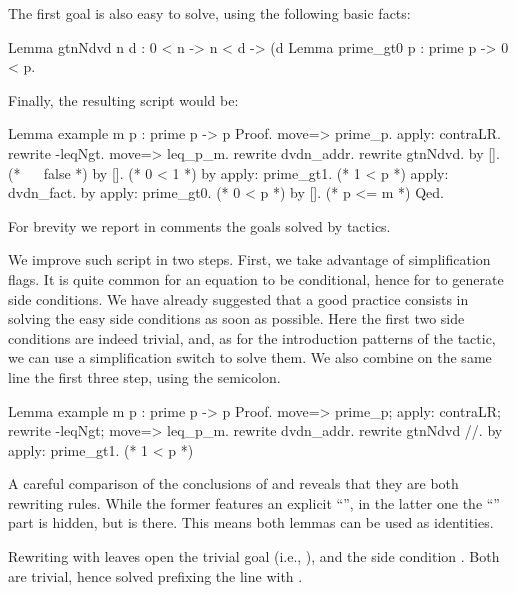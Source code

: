 The first goal is also easy to solve, using the following basic facts:

\begin{coq}{}{}
Lemma gtnNdvd n d : 0 < n -> n < d -> (d %
Lemma prime_gt0 p : prime p -> 0 < p.
\end{coq}
Finally, the resulting script would be:

\begin{coq}{}{}
Lemma example m p : prime p -> p %
Proof.
move=> prime_p.
apply: contraLR.
rewrite -leqNgt.
move=> leq_p_m.
rewrite dvdn_addr.
  rewrite gtnNdvd.
    by [].  (* ~~ false *)
    by [].  (* 0 < 1 *)
  by apply: prime_gt1.  (* 1 < p *)
apply: dvdn_fact.
  by apply: prime_gt0. (* 0 < p *)
by []. (* p <= m *)
Qed.
\end{coq}
For brevity we report in comments the goals solved by tactics.

We improve such script in two steps.  First, we take advantage of
 simplification flags.  It is quite common
for an equation to be conditional, hence for  to generate side
conditions.  We have already suggested that a good practice consists
in solving the easy side conditions
as soon as possible.  Here the first two side conditions are indeed
trivial, and, as for the introduction patterns of the  tactic,
we can use a simplification switch \C{//} to solve them.
We also combine on the same line the first three step, using
the semicolon.

\begin{coq}{}{}
Lemma example m p : prime p -> p %
Proof.
move=> prime_p; apply: contraLR; rewrite -leqNgt; move=> leq_p_m.
rewrite dvdn_addr.
  rewrite gtnNdvd //.
  by apply: prime_gt1.  (* 1 < p *)
\end{coq}
A careful comparison of the conclusions of 
and  reveals that they are both rewriting rules.  While
the former features an explicit ``'', in the
latter one the ``'' part is hidden, but is there.
This means
both lemmas can be used as identities.


Rewriting with
 leaves open the trivial goal  (i.e., ),
and the side condition .  Both are trivial, hence
solved prefixing the line with .

